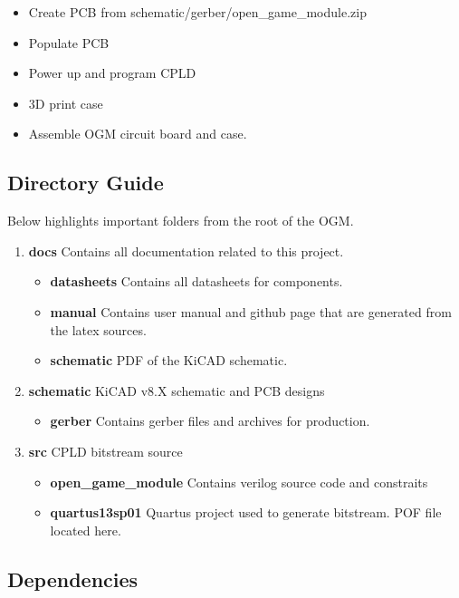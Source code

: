 \begin{itemize}
  \item Create PCB from schematic/gerber/open\_game\_module.zip
  \item Populate PCB
  \item Power up and program CPLD
  \item 3D print case
  \item Assemble OGM circuit board and case.
\end{itemize}

\subsection{Directory Guide}

\par
Below highlights important folders from the root of the OGM.

\begin{enumerate}
  \item \textbf{docs} Contains all documentation related to this project.
    \begin{itemize}
      \item \textbf{datasheets} Contains all datasheets for components.
      \item \textbf{manual} Contains user manual and github page that are generated from the latex sources.
      \item \textbf{schematic} PDF of the KiCAD schematic.
    \end{itemize}
  \item \textbf{schematic} KiCAD v8.X schematic and PCB designs
    \begin{itemize}
      \item \textbf{gerber} Contains gerber files and archives for production.
    \end{itemize}
  \item \textbf{src} CPLD bitstream source
    \begin{itemize}
      \item \textbf{open\_game\_module} Contains verilog source code and constraits
      \item \textbf{quartus13sp01} Quartus project used to generate bitstream. POF file located here.
    \end{itemize}
\end{enumerate}

\subsection{Dependencies}

